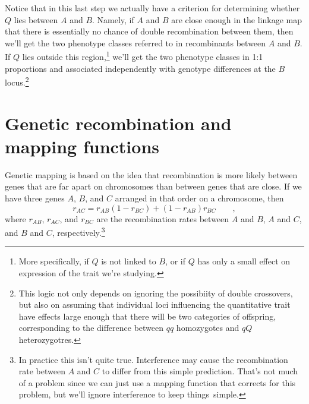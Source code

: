 \noindent Notice that in this last step we actually have a criterion
for determining whether $Q$ lies between $A$ and $B$. Namely, if $A$
and $B$ are close enough in the linkage map that there is essentially
no chance of double recombination between them, then we'll get the two
phenotype classes referred to in recombinants between $A$ and $B$. If
$Q$ lies outside this region,\footnote{More specifically, if $Q$ is
  not linked to $B$, or if $Q$ has only a small effect on expression
  of the trait we're studying.} we'll get the two phenotype classes in
1:1 proportions and associated independently with genotype differences
at the $B$ locus.\footnote{This logic not only depends on ignoring the
  possibiity of double crossovers, but also on assuming that
  individual loci influencing the quantitative trait have effects
  large enough that there will be two categories of offspring,
  corresponding to the difference between $qq$ homozygotes and $qQ$
  heterozygotres.} 


\section*{Genetic recombination and mapping functions}

Genetic mapping is based on the idea that recombination is more likely
between genes that are far apart on chromosomes than between genes
that are close. If we have three genes $A$, $B$, and $C$ arranged in
that order on a chromosome, then
\[
r_{AC} = r_{AB}(1-r_{BC}) + (1-r_{AB})r_{BC} \qquad ,
\]
where $r_{AB}$, $r_{AC}$, and $r_{BC}$ are the recombination rates
between $A$ and $B$, $A$ and $C$, and $B$ and $C$,
respectively.\footnote{In practice this isn't quite true. Interference
  may cause the recombination rate between $A$ and $C$ to differ from
  this simple prediction. That's not much of a problem since we can
  just use a mapping function that corrects for this problem, but
  we'll ignore interference to keep things~simple.}

